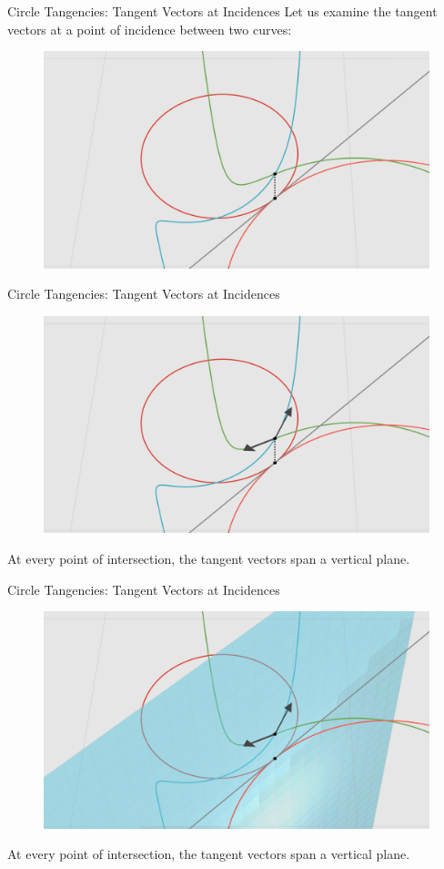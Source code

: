 \documentclass{beamer}
\newcommand{\nfr}[1]{\begin{frame} #1
\end{frame}}
\begin{document}
\nfr{{Circle Tangencies: Tangent Vectors at Incidences}
Let us examine the tangent vectors at a point of incidence between two curves:
\begin{figure}[h]
    \centering
    \includegraphics[width=0.8
    \textwidth, trim={5cm 0 4cm 2cm}, clip=true]{images/Diagram5a.png}
\end{figure}

}
\nfr{{Circle Tangencies: Tangent Vectors at Incidences}

\begin{figure}[h]
    \centering
    \includegraphics[width=0.8
    \textwidth, trim={5cm 0 4cm 2cm}, clip=true]{images/Diagram5b.png}
\end{figure} \pause
At every point of intersection, the tangent vectors span a vertical plane. 
}
\nfr{{Circle Tangencies: Tangent Vectors at Incidences}

\begin{figure}[h]
    \centering
    \includegraphics[width=0.8
    \textwidth, trim={5cm 0 4cm 2cm}, clip=true]{images/Diagram5c.png}
\end{figure}

At every point of intersection, the tangent vectors span a vertical plane. 

}
\end{document}
